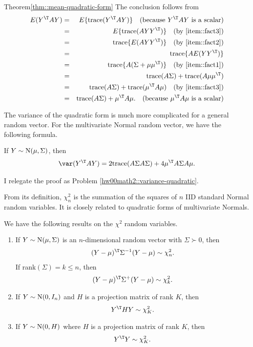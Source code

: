 \begin{myproof}{Theorem}{\ref{thm::mean-quadratic-form}}
The conclusion follows from
\begin{eqnarray*}
E(Y^{\T}AY) & = &E\{ \text{trace}(Y^{\T}AY) \} \quad (\text{because } Y^{\T}AY \text{ is a scalar}) \\
 & = &E\{ \text{trace}(AYY^{\T}) \} \quad 
 (\text{by }\eqref{item::fact3}) \\
 & =& \text{trace}\{ E(AYY^{\T}) \} \quad
 (\text{by }\eqref{item::fact2})\\
 & = &\text{trace}\{ AE(YY^{\T}) \} \\
 & =& \text{trace}\{ A(\Sigma+\mu\mu^{\T}) \} \quad
 (\text{by }\eqref{item::fact1})\\
 & = &\text{trace}(A\Sigma) + \text{trace}(A\mu\mu^{\T})\\
 & =&\text{trace}(A\Sigma)+\text{trace}(\mu^{\T}A\mu) \quad 
 (\text{by }\eqref{item::fact3})\\
 & =&\text{trace}(A\Sigma)+\mu^{\T}A\mu. \quad (\text{because } \mu^{\T}A\mu \text{ is a scalar}) 
\end{eqnarray*}
\end{myproof}


The variance of the quadratic form is much more complicated for a general
random vector. For the multivariate Normal random vector, we have the
following formula.
\begin{theorem}
\label{thm:varianceofquadraticforms}
If $Y\sim\textup{N}(\mu,\Sigma)$,
then
\[
\var(Y^{\T}AY)=2\textup{trace}(A\Sigma A\Sigma)+4\mu^{\T}A\Sigma A\mu.
\]
\end{theorem}

I relegate the proof as Problem \ref{hw00math2::variance-quadratic}. 


From its definition, $\chi_n^2$ is the summation of the squares of $n$ IID standard Normal random variables. It is closely related to
quadratic forms of multivariate Normals. 

\begin{theorem}\label{thm::normal-chisq}
We have the following results on the $\chi^2$ random variables. 
\begin{enumerate}
\item If $Y\sim\textup{N}(\mu,\Sigma)$ is an $n$-dimensional random vector
with $\Sigma\succ 0$, then 
\[
(Y-\mu)^{\T}\Sigma^{-1}(Y-\mu)\sim\chi_{n}^{2}.
\]
If rank$(\Sigma) = k \leq n$, then 
$$
(Y-\mu)^{\T}\Sigma^{+}(Y-\mu)\sim\chi_{k}^{2}.
$$

\item If $Y\sim\textup{N}(0,I_{n})$ and $H$ is a projection matrix of rank
$K$, then 
\[
Y^{\T}HY\sim\chi_{K}^{2}.
\]
\item If $Y\sim\textup{N}(0,H)$ where $H$ is a projection matrix of rank
$K$, then
\[
Y^{\T}Y\sim\chi_{K}^{2}.
\]
\end{enumerate}
\end{theorem}

